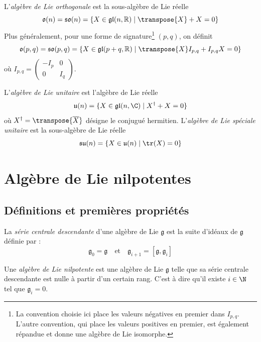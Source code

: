 \begin{definition}
    L'\emph{algèbre de Lie orthogonale} est la sous-algèbre de Lie réelle
    $$\mathfrak{o}(n) = \mathfrak{so}(n) = \{ X \in \mathfrak{gl}(n, \mathbb{R}) \mid \transpose{X} + X = 0 \}$$
    Plus généralement, pour une forme de signature\footnote{La convention choisie ici place les valeurs négatives en premier dans $I_{p,q}$. L'autre convention, qui place les valeurs positives en premier, est également répandue et donne une algèbre de Lie isomorphe.} $(p, q)$, on définit
    $$\mathfrak{o}(p, q) = \mathfrak{so}(p, q) = \{ X \in \mathfrak{gl}(p+q, \mathbb{R}) \mid \transpose{X} I_{p,q} + I_{p,q} X = 0 \}$$
    où $I_{p,q} = \begin{pmatrix} -I_p & 0 \\ 0 & I_q \end{pmatrix}$.
\end{definition}

\begin{definition}
    L'\emph{algèbre de Lie unitaire} est l'algèbre de Lie réelle
    $$\mathfrak{u}(n) = \{ X \in \mathfrak{gl}(n, \C) \mid X^\dagger + X = 0 \}$$
    où $X^\dagger = \transpose{{\overline{X}}}$ désigne le conjugué hermitien. L'\emph{algèbre de Lie spéciale unitaire} est la sous-algèbre de Lie réelle
    $$\mathfrak{su}(n) = \{ X \in \mathfrak{u}(n) \mid \tr(X) = 0 \}$$
\end{definition}

\section{Algèbre de Lie nilpotentes}

\subsection{Définitions et premières propriétés}

\begin{definition}
    La \emph{série centrale descendante} d'une algèbre de Lie $\mathfrak{g}$ est la suite d'idéaux de $\mathfrak{g}$ définie par :
    $$\mathfrak{g}_0 = \mathfrak{g} \quad \text{et} \quad \mathfrak{g}_{i+1} = [\mathfrak{g}, \mathfrak{g}_i]$$
\end{definition}

\begin{definition}
    Une \emph{algèbre de Lie nilpotente} est une algèbre de Lie $\mathfrak{g}$ telle que sa série centrale descendante est nulle à partir d'un certain rang. C'est à dire qu'il existe $i \in \N$ tel que $\mathfrak{g}_i = 0$.
\end{definition}

